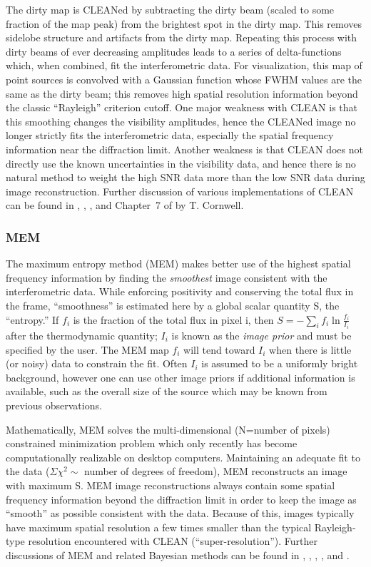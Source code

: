 \documentclass[12pt]{article}
\begin{document}
The dirty map is CLEANed by subtracting the dirty beam (scaled to
some fraction of the map peak) from the brightest spot in the dirty
map.  This removes sidelobe structure and artifacts from the dirty
map.  Repeating this process with dirty beams of ever decreasing
amplitudes leads to a series of delta-functions which, when combined,
fit the interferometric data.  For visualization, this map of point
sources is convolved with a Gaussian function whose FWHM values are
the same as the dirty beam; this removes high spatial resolution
information beyond the classic ``Rayleigh'' criterion cutoff.
One major weakness with CLEAN is that this smoothing changes
the visibility amplitudes, hence the CLEANed image no longer
strictly fits the interferometric data, especially the
spatial frequency information near the diffraction limit.
Another weakness is that CLEAN does not
directly use the known uncertainties
in the visibility data, and hence there is no natural method to
weight the high SNR data more than the low SNR data during image
reconstruction.  Further discussion of various
implementations of CLEAN can be found in \cite{clark80}, \cite{schwab84}, 
\cite{cornwell83}, and Chapter~7 of \cite{nrao86} by T. Cornwell.

\subsubsection{MEM}
\label{monnier_mem}
The maximum entropy method (MEM) makes better use of the highest
spatial frequency information by finding the {\em
smoothest} image consistent with the interferometric data.  While
enforcing positivity and conserving the total flux in the frame,
``smoothness'' is estimated here by a global scalar quantity S, the
``entropy.''  If $f_i$ is the fraction of the total flux in pixel i,
then $S=-\sum_{i} f_i \ln \frac{f_i}{I_i}$ after the thermodynamic quantity;
$I_i$ is known as the {\em image prior} and must be specified by the user.
The MEM map $f_i$ will tend toward $I_i$ when there is
little (or noisy) data to constrain the fit.  Often $I_i$ is assumed to
be a uniformly bright background, however one can use other image priors if
additional information is available, such as
the overall size of the source which may be known from previous observations.

Mathematically, MEM solves the multi-dimensional (N=number of
pixels) constrained minimization problem which only
recently has become computationally realizable on desktop computers.
Maintaining an adequate fit to the data ($\Sigma\chi^2 \sim$ number of
degrees of freedom), MEM reconstructs an image with maximum S.  MEM
image reconstructions always contain some spatial frequency
information beyond the diffraction limit in order to keep the image
as ``smooth'' as possible consistent with the data.
Because of this, images typically have maximum spatial resolution a few times
smaller than the typical Rayleigh-type resolution encountered with CLEAN
 (``super-resolution'').
Further discussions of MEM and related Bayesian methods can be found in
\cite{pp92}, \cite{nn86},
\cite{sb84}, \cite{mem83}, and \cite{sivia87}.
\end{document}
